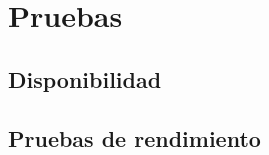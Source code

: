 \section{Pruebas}

\subsection{Disponibilidad}
 
\subsection{Pruebas de rendimiento}

\newpage





